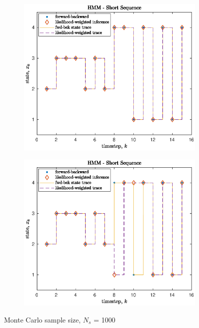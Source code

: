 \documentclass[]{article}
\begin{document}
\begin{figure}[H]
	\begin{subfigure}[b]{0.45\textwidth}
		\begin{center}  
			\includegraphics[scale=0.55]{p2_state_trace_1000_1.eps}  
			\caption{}
			\label{}
		\end{center}
	\end{subfigure}
	\hfill
	\begin{subfigure}[b]{0.45\textwidth}
		\begin{center}  
			\includegraphics[scale=0.55]{p2_state_trace_1000_2.eps}  
			\caption{}
			\label{}
		\end{center}
	\end{subfigure}
	\caption{Monte Carlo sample size, $N_s$ = 1000}
\end{figure}
\end{document}
